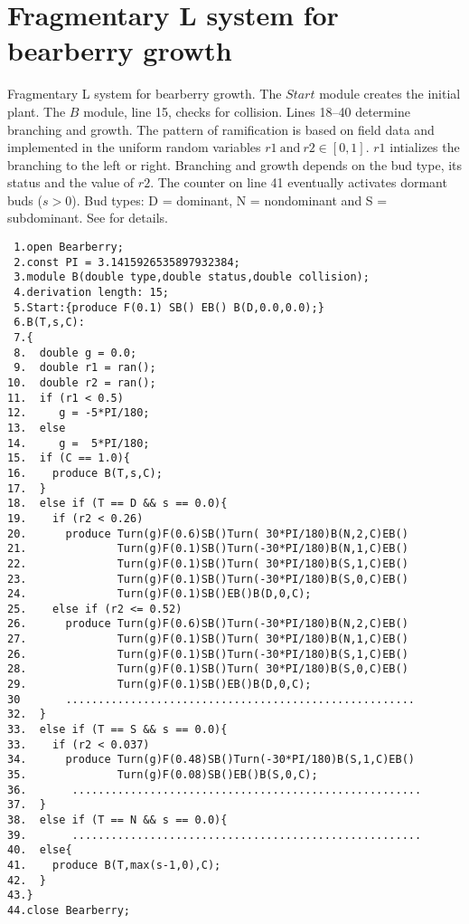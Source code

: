 \section{Fragmentary  L system   for  bearberry  growth}\label{sec:L2}

Fragmentary L system for  bearberry growth. The $Start$ module creates
the initial  plant.  The  $B$ module, line  15, checks  for collision.
Lines  18--40   determine  branching  and  growth.    The  pattern  of
ramification is  based on  field data and  implemented in  the uniform
random variables $r1~\mathrm{and}~r2  \in [0,1]$.  $r1$ intializes the
branching to the  left or right.  Branching and  growth depends on the
bud type,  its status and the value  of $r2$.  The counter  on line 41
eventually activates dormant buds ($s > 0$).  Bud types: D = dominant,
N  = nondominant  and  S =  subdominant.   See \citet{salemaa:02}  for
details.

\begin{verbatim}
 1.open Bearberry;
 2.const PI = 3.1415926535897932384;
 3.module B(double type,double status,double collision); 
 4.derivation length: 15;
 5.Start:{produce F(0.1) SB() EB() B(D,0.0,0.0);}
 6.B(T,s,C):
 7.{
 8.  double g = 0.0;
 9.  double r1 = ran();
10.  double r2 = ran();
11.  if (r1 < 0.5) 
12.     g = -5*PI/180;
13.  else 
14.     g =  5*PI/180;
15.  if (C == 1.0){
16.    produce B(T,s,C);
17.  }
18.  else if (T == D && s == 0.0){
19.    if (r2 < 0.26)
20.      produce Turn(g)F(0.6)SB()Turn( 30*PI/180)B(N,2,C)EB() 
21.              Turn(g)F(0.1)SB()Turn(-30*PI/180)B(N,1,C)EB()
22.              Turn(g)F(0.1)SB()Turn( 30*PI/180)B(S,1,C)EB()
23.              Turn(g)F(0.1)SB()Turn(-30*PI/180)B(S,0,C)EB()
24.              Turn(g)F(0.1)SB()EB()B(D,0,C);
25.    else if (r2 <= 0.52)
26.      produce Turn(g)F(0.6)SB()Turn(-30*PI/180)B(N,2,C)EB() 
27.              Turn(g)F(0.1)SB()Turn( 30*PI/180)B(N,1,C)EB()
26.              Turn(g)F(0.1)SB()Turn(-30*PI/180)B(S,1,C)EB()
28.              Turn(g)F(0.1)SB()Turn( 30*PI/180)B(S,0,C)EB()
29.              Turn(g)F(0.1)SB()EB()B(D,0,C);
30       ......................................................
32.  } 
33.  else if (T == S && s == 0.0){
33.    if (r2 < 0.037)
34.      produce Turn(g)F(0.48)SB()Turn(-30*PI/180)B(S,1,C)EB()
35.              Turn(g)F(0.08)SB()EB()B(S,0,C);
36.       ......................................................
37.  }
38.  else if (T == N && s == 0.0){
39.       ......................................................
40.  else{
41.    produce B(T,max(s-1,0),C);
42.  }
43.}
44.close Bearberry;
\end{verbatim}

